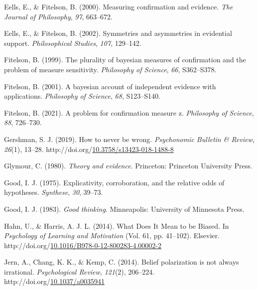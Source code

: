 \documentclass[10pt, letterpaper]{article}
\newenvironment{CSLReferences}%
  {}%
  {\par}
\begin{document}
\begin{CSLReferences}{1}{0}
\leavevmode{}%
Eells, E., \& Fitelson, B. (2000). Measuring confirmation and evidence.
\emph{The Journal of Philosophy}, \emph{97}, 663--672.

\leavevmode{}%
Eells, E., \& Fitelson, B. (2002). Symmetries and asymmetries in
evidential support. \emph{Philosophical Studies}, \emph{107}, 129--142.

\leavevmode{}%
Fitelson, B. (1999). The plurality of bayesian measures of confirmation
and the problem of measure sensitivity. \emph{Philosophy of Science},
\emph{66}, S362--S378.

\leavevmode{}%
Fitelson, B. (2001). A bayesian account of independent evidence with
applications. \emph{Philosophy of Science}, \emph{68}, S123--S140.

\leavevmode{}%
Fitelson, B. (2021). A problem for confirmation measure z.
\emph{Philosophy of Science}, \emph{88}, 726--730.

\leavevmode{}%
Gershman, S. J. (2019). How to never be wrong. \emph{Psychonomic
Bulletin \& Review}, \emph{26}(1), 13--28.
http://doi.org/\href{https://doi.org/10.3758/s13423-018-1488-8}{10.3758/s13423-018-1488-8}

\leavevmode{}%
Glymour, C. (1980). \emph{Theory and evidence}. Princeton: Princeton
University Press.

\leavevmode{}%
Good, I. J. (1975). Explicativity, corroboration, and the relative odds
of hypotheses. \emph{Synthese}, \emph{30}, 39--73.

\leavevmode{}%
Good, I. J. (1983). \emph{Good thinking}. Minneapolis: University of
Minnesota Press.

\leavevmode{}%
Hahn, U., \& Harris, A. J. L. (2014). What {Does} {It} {Mean} to be
{Biased}. In \emph{Psychology of {Learning} and {Motivation}} (Vol. 61,
pp. 41--102). Elsevier.
http://doi.org/\href{https://doi.org/10.1016/B978-0-12-800283-4.00002-2}{10.1016/B978-0-12-800283-4.00002-2}

\leavevmode{}%
Jern, A., Chang, K. K., \& Kemp, C. (2014). Belief polarization is not
always irrational. \emph{Psychological Review}, \emph{121}(2), 206--224.
http://doi.org/\href{https://doi.org/10.1037/a0035941}{10.1037/a0035941}


\end{CSLReferences}
\end{document}
